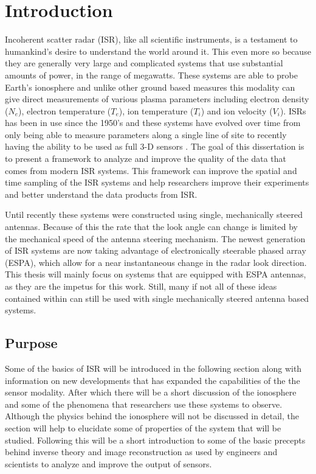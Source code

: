 \chapter{Introduction}
\label{chapter:body}
\thispagestyle{myheadings}
\setcounter{tocdepth}{1}
\graphicspath{{1_Intro/Figures/}}

Incoherent scatter radar (ISR), like all scientific instruments, is a testament to humankind's desire to understand the world around it. This even more so because they are generally very large and complicated systems that use substantial amounts of power, in the range of megawatts. These systems are able to probe Earth's ionosphere and unlike other ground based measures this modality can give direct measurements of various plasma parameters including electron density ($N_e$), electron temperature ($T_e$), ion temperature ($T_i$) and ion velocity ($V_i$). ISRs has been in use since the 1950's \cite{gordon58} and these systems have evolved over time from only being able to measure parameters along a single line of site to recently having the ability to be used as full 3-D sensors \cite{Semeter2009738,Nicolls:2007ie}. The goal of this dissertation is to present a framework to analyze and improve the quality of the data that comes from modern ISR systems. This framework can  improve the spatial and time sampling of the ISR systems and help researchers improve their experiments and better understand the data products from ISR.

Until recently these systems were constructed using single, mechanically steered antennas. Because of this the rate that the look angle can change is limited by the mechanical speed of the antenna steering mechanism. The newest generation of ISR systems are now taking advantage of electronically steerable phased array (ESPA), which allow for a near instantaneous change in the radar look direction. This thesis will mainly focus on systems that are equipped with ESPA antennas, as they are the impetus for this work. Still, many if not all of these ideas contained within can still be used with single mechanically steered antenna based systems. 
 
\section{Purpose}
Some of the basics of ISR will be introduced in the following section along with information on new developments that has expanded the capabilities of the the sensor modality. After which there will be a short discussion of the ionosphere and some of the phenomena that researchers use these systems to observe. Although the physics behind the ionosphere will not be discussed in detail, the section will help to elucidate some of properties of the system that will be studied. Following this will be a short introduction to some of the basic precepts behind inverse theory and image reconstruction as used by engineers and scientists to analyze and improve the output of sensors.


